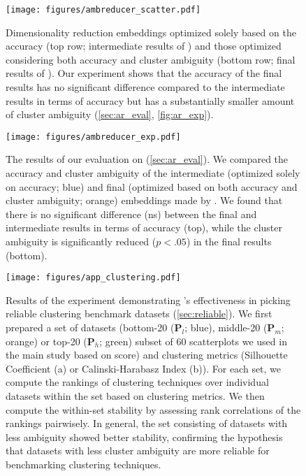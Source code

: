 \begin{figure}[t]
    \centering
    \texttt{[image: figures/ambreducer\_scatter.pdf]} \vspace{-5mm}
    \caption{Dimensionality reduction embeddings optimized solely based on the accuracy (top row; intermediate results of \ambreducer) and those optimized considering both accuracy and cluster ambiguity (bottom row; final results of \ambreducer). Our experiment shows that the accuracy of the final results has no significant difference compared to the intermediate results in terms of accuracy but has a substantially smaller amount of cluster ambiguity (\autoref{sec:ar_eval}, \autoref{fig:ar_exp}). \vspace{-4mm}}
    \label{fig:ar_scatter}
\end{figure}


\begin{figure}[t]
    \centering
    \texttt{[image: figures/ambreducer\_exp.pdf]} \vspace{-7mm}
    \caption{The results of our evaluation on \ambreducer (\autoref{sec:ar_eval}). 
    We compared the accuracy and cluster ambiguity of the intermediate (optimized solely on accuracy; blue) and final (optimized based on both accuracy and cluster ambiguity; orange) embeddings made by \ambreducer.
    We found that there is no significant difference (ns) between the final and intermediate results in terms of accuracy (top), while the cluster ambiguity is significantly reduced ($p<.05$) in the final results (bottom). \vspace{-5mm}}
    \label{fig:ar_exp}
\end{figure}

\begin{figure*}
    \centering
    \texttt{[image: figures/app\_clustering.pdf]}
    \vspace{-6.5mm}
    \caption{
    Results of the experiment demonstrating \measure's effectiveness in picking reliable clustering benchmark datasets (\autoref{sec:reliable}). 
    We first prepared a set of datasets (bottom-20 ($\mathbf{P}_l$; blue), middle-20 ($\mathbf{P}_m$; orange) or top-20 ($\mathbf{P}_h$; green) subset of 60 scatterplots we used in the main study based on \measure score) and clustering metrics (Silhouette Coefficient (a) or Calinski-Harabasz Index (b)).
    For each set, we compute the rankings of clustering techniques over individual datasets within the set based on clustering metrics.
    We then compute the within-set stability by assessing rank correlations of the rankings pairwisely.
    In general, the set consisting of datasets with less ambiguity showed better stability, confirming the hypothesis that datasets with less cluster ambiguity are more reliable for benchmarking clustering techniques.
    \vspace{-4.5mm}
    }
    \label{fig:app_clustering}
\end{figure*}



